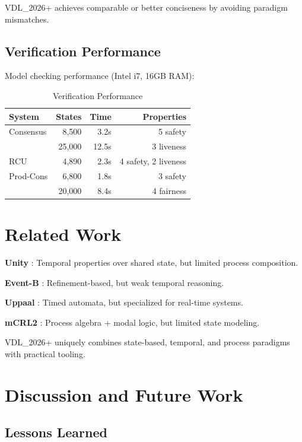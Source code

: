 \documentclass[conference]{IEEEtran}
\begin{document}
VDL\_2026+ achieves comparable or better conciseness by avoiding paradigm mismatches.

\subsection{Verification Performance}

Model checking performance (Intel i7, 16GB RAM):

\begin{table}[h]
\centering
\caption{Verification Performance}
\label{tab:performance}
\begin{tabular}{|l|r|r|r|}
\hline
\textbf{System} & \textbf{States} & \textbf{Time} & \textbf{Properties} \\
\hline
Consensus & 8,500 & 3.2s & 5 safety \\
 & 25,000 & 12.5s & 3 liveness \\
RCU & 4,890 & 2.3s & 4 safety, 2 liveness \\
Prod-Cons & 6,800 & 1.8s & 3 safety \\
 & 20,000 & 8.4s & 4 fairness \\
\hline
\end{tabular}
\end{table}

\section{Related Work}
\label{sec:related}

\textbf{Unity} \cite{chandy1988}: Temporal properties over shared state, but limited process composition.

\textbf{Event-B} \cite{abrial2010}: Refinement-based, but weak temporal reasoning.

\textbf{Uppaal} \cite{uppaal}: Timed automata, but specialized for real-time systems.

\textbf{mCRL2} \cite{mcrl2}: Process algebra + modal logic, but limited state modeling.

VDL\_2026+ uniquely combines state-based, temporal, and process paradigms with practical tooling.

\section{Discussion and Future Work}
\label{sec:discussion}

\subsection{Lessons Learned}
\end{document}
